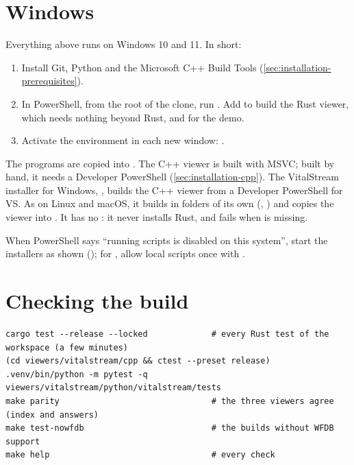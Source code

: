 \section{Windows}
\label{sec:installation-windows}

Everything above runs on Windows 10 and 11. In short:
\begin{enumerate}
\item Install Git, Python and the Microsoft C++ Build Tools (\cref{sec:installation-prerequisites}).
\item In PowerShell, from the root of the clone, run
  . Add
   to build the Rust viewer, which needs nothing beyond Rust, and  for
  the demo.
\item Activate the environment in each new window:
  .
\end{enumerate}
The programs are copied into . The C++ viewer is built with
MSVC; built by hand, it needs a Developer PowerShell (\cref{sec:installation-cpp}). The
VitalStream installer for Windows, ,
builds the C++ viewer from a Developer PowerShell for VS. As on Linux and macOS, it builds in
folders of its own (,
) and copies the viewer into
. It has no : it never
installs Rust, and  fails when  is missing.

When PowerShell says ``running scripts is disabled on this system'', start the installers as
shown (); for , allow
local scripts once with .

\section{Checking the build}
\label{sec:installation-check}

\begin{lstlisting}[style=shell]
cargo test --release --locked             # every Rust test of the workspace (a few minutes)
(cd viewers/vitalstream/cpp && ctest --preset release)
.venv/bin/python -m pytest -q viewers/vitalstream/python/vitalstream/tests
make parity                               # the three viewers agree (index and answers)
make test-nowfdb                          # the builds without WFDB support
make help                                 # every check
\end{lstlisting}

